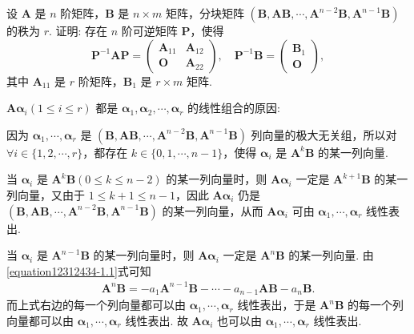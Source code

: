 \documentclass[../../main.tex]{subfiles}
\begin{document}
\begin{example}
设 $\boldsymbol{A}$ 是 $n$ 阶矩阵，$\boldsymbol{B}$ 是 $n\times m$ 矩阵，分块矩阵 $(\boldsymbol{B},\boldsymbol{A}\boldsymbol{B},\cdots,\boldsymbol{A}^{n - 2}\boldsymbol{B},\boldsymbol{A}^{n - 1}\boldsymbol{B})$ 的秩为 $r$. 证明: 存在 $n$ 阶可逆矩阵 $\boldsymbol{P}$，使得
\[
\boldsymbol{P}^{-1}\boldsymbol{A}\boldsymbol{P}=\begin{pmatrix}
\boldsymbol{A}_{11} & \boldsymbol{A}_{12} \\
\boldsymbol{O} & \boldsymbol{A}_{22}
\end{pmatrix}, \quad
\boldsymbol{P}^{-1}\boldsymbol{B}=\begin{pmatrix}
\boldsymbol{B}_1 \\
\boldsymbol{O}
\end{pmatrix},
\]
其中 $\boldsymbol{A}_{11}$ 是 $r$ 阶矩阵，$\boldsymbol{B}_1$ 是 $r\times m$ 矩阵.
\end{example}
\begin{remark}
\hypertarget{例题0.7容易验证的原因}{$\boldsymbol{A}\boldsymbol{\alpha}_i(1\leq i\leq r)$ 都是 $\boldsymbol{\alpha}_1,\boldsymbol{\alpha}_2,\cdots,\boldsymbol{\alpha}_r$ 的线性组合的原因:}因为 $\boldsymbol{\alpha}_1,\cdots,\boldsymbol{\alpha}_r$ 是 $(\boldsymbol{B},\boldsymbol{A}\boldsymbol{B},\cdots,\boldsymbol{A}^{n - 2}\boldsymbol{B},\boldsymbol{A}^{n - 1}\boldsymbol{B})$ 列向量的极大无关组，所以对 $\forall i\in\{1,2,\cdots,r\}$，都存在 $k\in\{0,1,\cdots,n - 1\}$，使得 $\boldsymbol{\alpha}_i$ 是 $\boldsymbol{A}^k\boldsymbol{B}$ 的某一列向量.

当 $\boldsymbol{\alpha}_i$ 是 $\boldsymbol{A}^k\boldsymbol{B}(0\leqslant k\leqslant n - 2)$ 的某一列向量时，则 $\boldsymbol{A}\boldsymbol{\alpha}_i$ 一定是 $\boldsymbol{A}^{k + 1}\boldsymbol{B}$ 的某一列向量，又由于 $1\leqslant k + 1\leqslant n - 1$，因此 $\boldsymbol{A}\boldsymbol{\alpha}_i$ 仍是 $(\boldsymbol{B},\boldsymbol{AB},\cdots,\boldsymbol{A}^{n - 2}\boldsymbol{B},\boldsymbol{A}^{n - 1}\boldsymbol{B})$ 的某一列向量，从而 $\boldsymbol{A}\boldsymbol{\alpha}_i$ 可由 $\boldsymbol{\alpha}_1,\cdots,\boldsymbol{\alpha}_r$ 线性表出.

当 $\boldsymbol{\alpha}_i$ 是 $\boldsymbol{A}^{n - 1}\boldsymbol{B}$ 的某一列向量时，则 $\boldsymbol{A}\boldsymbol{\alpha}_i$ 一定是 $\boldsymbol{A}^n\boldsymbol{B}$ 的某一列向量. 由\eqref{equation12312434-1.1}式可知
\begin{align*}
\boldsymbol{A}^n\boldsymbol{B}=-a_1\boldsymbol{A}^{n - 1}\boldsymbol{B}-\cdots - a_{n - 1}\boldsymbol{A}\boldsymbol{B}-a_n\boldsymbol{B}.
\end{align*}
而上式右边的每一个列向量都可以由 $\boldsymbol{\alpha}_1,\cdots,\boldsymbol{\alpha}_r$ 线性表出，于是 $\boldsymbol{A}^n\boldsymbol{B}$ 的每一个列向量都可以由 $\boldsymbol{\alpha}_1,\cdots,\boldsymbol{\alpha}_r$ 线性表出. 故 $\boldsymbol{A}\boldsymbol{\alpha}_i$ 也可以由 $\boldsymbol{\alpha}_1,\cdots,\boldsymbol{\alpha}_r$ 线性表出. 
\end{remark}
\end{document}
